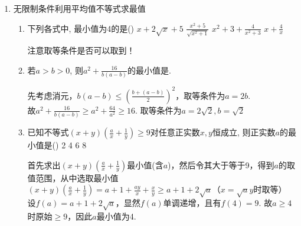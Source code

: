\begin{enumerate}
\begin{enumerate}
\begin{enumerate}
        \item 若关于$x$的不等式$\abs{x-1}-\abs{x-2}<a$的解集为$\varnothing$, 则实数$a$的取值范围为. 
    \end{enumerate}
    \begin{jieda}
        斜坡函数$f(x) = |x+a|-|x+b|$，最大值为$|a-b|$，最小值为$-|a-b|$. \\
        例如：$f(x) = |x+1|-|x+2| = \left \{ \begin{array}{ll}
            1 & x < -2 \\
            -2x-3 & x \in [-2, -1] \\
            -1 & x > -1 \\
        \end{array}\right.$
    \end{jieda}
    \end{enumerate}
    \item 无限制条件利用平均值不等式求最值
    \begin{enumerate}
        \item 下列各式中, 最小值为4的是\dotfill()
        \xx
        {$x+2\sqrt{x}+5$}
        {$\frac{x^2+5}{\sqrt{x^2+1}}$}
        {$x^2+3+\frac{4}{x^2+3}$}
        {$x+\frac{4}{x}$}
        \begin{jieda}
            注意取等条件是否可以取到！
        \end{jieda}
        \item 若$a>b>0$, 则$a^2+\frac{16}{b(a-b)}$的最小值是. 
        \begin{jieda}
        先考虑消元，$b(a-b) \leq \left (\frac{b+(a-b)}{2}\right )^2$，取等条件为$a = 2b$. \\
        故$a^2+\frac{16}{b(a-b)} \geq a^2 + \frac{64}{a^2} \geq 16$. 取等条件为$a = 2\sqrt{2}, b = \sqrt{2}$
        \end{jieda}
        \item 已知不等式$(x+y)\left(\frac{a}{x}+\frac{1}{y}\right)\geq 9$对任意正实数$x,y$恒成立, 则正实数$a$的最小值是\dotfill()
        \xx
        {2}
        {4}
        {6}
        {8}
        \begin{jieda}
            首先求出$(x+y)\left(\frac{a}{x}+\frac{1}{y}\right)$最小值(含$a$)，然后令其大于等于9，得到$a$的取值范围，从中选取最小值\\
            $(x+y)\left(\frac{a}{x}+\frac{1}{y}\right) = a + 1 + \frac{ay}{x} + \frac{x}{y} \geq a + 1 + 2\sqrt{a}$（$x  = \sqrt{a}y$时取等）\\
            设$f(a) = a+1+2\sqrt{a}$，显然$f(a)$单调递增，且有$f(4) = 9$. 故$a \geq 4$时原始$\geq 9$，因此$a$最小值为4.

\end{jieda}
\end{enumerate}
\end{enumerate}
